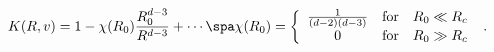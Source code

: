 \begin{equation}
\label{leadK}
K(R,v) = 1 - \chi (R_0) \frac{R_0^{d-3}}{R^{d-3}} + \cdots \spa
\chi(R_0) = \left\{ \begin{array}{ccc}
\frac{1}{(d-2)(d-3)} & \mbox{for} & R_0 \ll R_c \\
0 & \mbox{for} & R_0 \gg R_c \end{array} \right. \ .
\end{equation}

